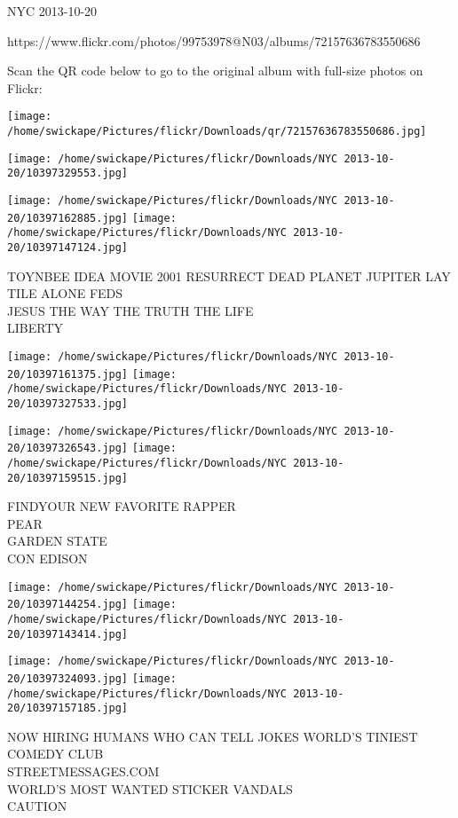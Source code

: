 \documentclass[10pt,letterpaper]{article}
\begin{document}
NYC 2013-10-20

https://www.flickr.com/photos/99753978@N03/albums/72157636783550686

Scan the QR code below to go to the original album with full-size photos on Flickr:

\texttt{[image: /home/swickape/Pictures/flickr/Downloads/qr/72157636783550686.jpg]}
\pagebreak

\texttt{[image: /home/swickape/Pictures/flickr/Downloads/NYC 2013-10-20/10397329553.jpg]}

\vspace{0.25in}
\texttt{[image: /home/swickape/Pictures/flickr/Downloads/NYC 2013-10-20/10397162885.jpg]}
\texttt{[image: /home/swickape/Pictures/flickr/Downloads/NYC 2013-10-20/10397147124.jpg]}

TOYNBEE IDEA MOVIE 2001 RESURRECT DEAD PLANET JUPITER LAY TILE ALONE FEDS\\
JESUS THE WAY THE TRUTH THE LIFE\\
LIBERTY
\pagebreak

\texttt{[image: /home/swickape/Pictures/flickr/Downloads/NYC 2013-10-20/10397161375.jpg]}
\texttt{[image: /home/swickape/Pictures/flickr/Downloads/NYC 2013-10-20/10397327533.jpg]}

\texttt{[image: /home/swickape/Pictures/flickr/Downloads/NYC 2013-10-20/10397326543.jpg]}
\texttt{[image: /home/swickape/Pictures/flickr/Downloads/NYC 2013-10-20/10397159515.jpg]}

FINDYOUR NEW FAVORITE RAPPER\\
PEAR\\
GARDEN STATE\\
CON EDISON
\pagebreak

\texttt{[image: /home/swickape/Pictures/flickr/Downloads/NYC 2013-10-20/10397144254.jpg]}
\texttt{[image: /home/swickape/Pictures/flickr/Downloads/NYC 2013-10-20/10397143414.jpg]}

\texttt{[image: /home/swickape/Pictures/flickr/Downloads/NYC 2013-10-20/10397324093.jpg]}
\texttt{[image: /home/swickape/Pictures/flickr/Downloads/NYC 2013-10-20/10397157185.jpg]}

NOW HIRING HUMANS WHO CAN TELL JOKES WORLD'S TINIEST COMEDY CLUB\\
STREETMESSAGES.COM\\
WORLD'S MOST WANTED STICKER VANDALS\\
CAUTION
\pagebreak
\end{document}
